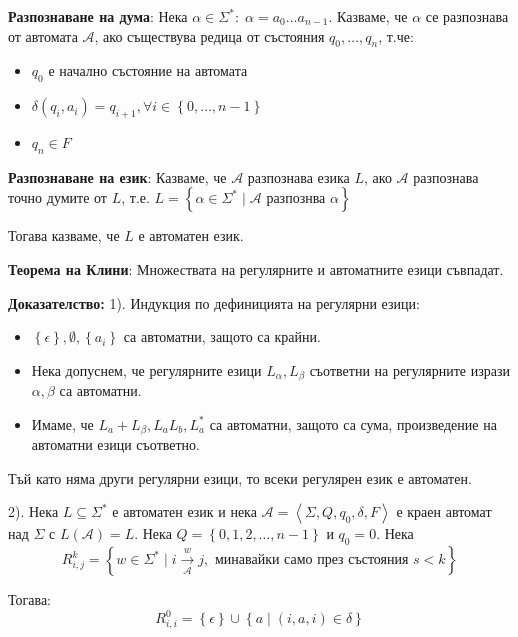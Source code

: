 \documentclass{article}
\renewcommand{\\}{\newline}
\newcommand{\sep}{\;|\;}
\newcommand{\doc}{\textbf{Доказателство: }}
\begin{document}
    \textbf{Разпознаване на дума}: Нека \(\alpha \in \Sigma^{*}:\; \alpha = a_{0}\dots a_{n-1}\). Казваме, че \(\alpha\) се разпознава от автомата \(\mathcal{A}\), ако съществува редица от състояния \(q_{0}, \dots, q_{n}\), т.че:
    \begin{itemize}
        \item \(q_{0}\) е начално състояние на автомата
        \item \(\delta(q_{i}, a_{i}) = q_{i+1}, \forall i \in \left\{0, \dots, n-1\right\}\) 
        \item \(q_{n} \in F\)  
    \end{itemize}

    \textbf{Разпознаване на език}: Казваме, че \(\mathcal{A}\) разпознава езика \(L\), ако \(\mathcal{A}\) разпознава точно думите от \(L\), т.е. \(L = \left\{\alpha \in \Sigma^{*} \sep \mathcal{A} \text{ разпознва }\alpha\right\}\)      

    Тогава казваме, че \(L\) е автоматен език. 

    \textbf{Теорема на Клини}: Множествата на регулярните и автоматните езици съвпадат. 

    \doc 1). Индукция по дефиницията на регулярни езици:
    \begin{itemize}
        \item \(\left\{\epsilon\right\}, \emptyset, \left\{a_i\right\}\) са автоматни, защото са крайни.
        \item Нека допуснем, че регулярните езици \(L_{\alpha}, L_{\beta}\) съответни на регулярните изрази \(\alpha, \beta\) са автоматни. 
        \item Имаме, че \(L_{a} + L_{\beta}, L_{a}L_{b}, L_{a}^{*}\) са автоматни, защото са сума, произведение на автоматни езици съответно.  
    \end{itemize}

    Тъй като няма други регулярни езици, то всеки регулярен език е автоматен. 

    2). Нека \(L\subseteq \Sigma^{*}\) е автоматен език и нека \(\mathcal{A} = \left\langle \Sigma, Q, q_{0}, \delta, F\right\rangle\) е краен автомат над \(\Sigma\) с \(L(\mathcal{A}) = L\). Нека \(Q = \left\{0, 1, 2, \dots, n-1\right\}\) и \(q_{0} = 0\). Нека \[
      R_{i, j}^{k} = \left\{w \in \Sigma^{*} \sep i \overset{w}{\underset{\mathcal{A}}{\rightarrow}} j, \text{ минавайки само през състояния } s < k\right\}
    \]     

    Тогава: \[
      R^{0}_{i, i} = \left\{\epsilon\right\} \cup \left\{a \sep (i, a, i) \in \delta\right\}
    \] 
\end{document}
